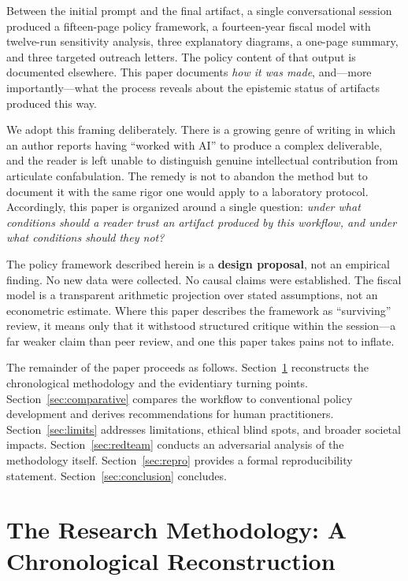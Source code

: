 \documentclass[11pt,a4paper]{article}
\begin{document}
Between the initial prompt and the final artifact, a single conversational session produced a fifteen-page policy framework, a fourteen-year fiscal model with twelve-run sensitivity analysis, three explanatory diagrams, a one-page summary, and three targeted outreach letters. The policy content of that output is documented elsewhere. This paper documents \emph{how it was made}, and---more importantly---what the process reveals about the epistemic status of artifacts produced this way.

We adopt this framing deliberately. There is a growing genre of writing in which an author reports having ``worked with AI'' to produce a complex deliverable, and the reader is left unable to distinguish genuine intellectual contribution from articulate confabulation. The remedy is not to abandon the method but to document it with the same rigor one would apply to a laboratory protocol. Accordingly, this paper is organized around a single question: \emph{under what conditions should a reader trust an artifact produced by this workflow, and under what conditions should they not?}

\begin{tcolorbox}[keybox, title=A Note on Authorship and Epistemic Status]
The policy framework described herein is a \textbf{design proposal}, not an empirical finding. No new data were collected. No causal claims were established. The fiscal model is a transparent arithmetic projection over stated assumptions, not an econometric estimate. Where this paper describes the framework as ``surviving'' review, it means only that it withstood structured critique within the session---a far weaker claim than peer review, and one this paper takes pains not to inflate.
\end{tcolorbox}

The remainder of the paper proceeds as follows. Section~\ref{sec:method} reconstructs the chronological methodology and the evidentiary turning points. Section~\ref{sec:comparative} compares the workflow to conventional policy development and derives recommendations for human practitioners. Section~\ref{sec:limits} addresses limitations, ethical blind spots, and broader societal impacts. Section~\ref{sec:redteam} conducts an adversarial analysis of the methodology itself. Section~\ref{sec:repro} provides a formal reproducibility statement. Section~\ref{sec:conclusion} concludes.

\section{The Research Methodology: A Chronological Reconstruction}
\label{sec:method}
\end{document}
